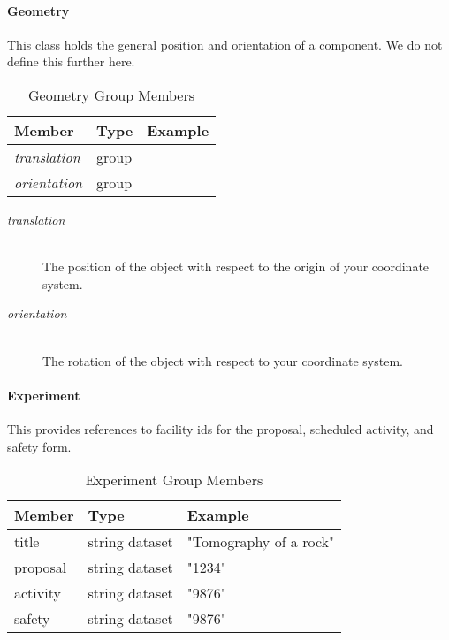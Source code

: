 \paragraph{Geometry}
\label{table:geometry}

This class holds the general position and orientation of a component. We do not define this
further here.

\begin{table}[h!]\sffamily \footnotesize
\centering
\caption{Geometry Group Members}
\begin{tabular}{l l l}
\toprule
\bfseries Member     & \bfseries Type & \bfseries Example \\
\midrule

\emph{translation} & group &  \\
\emph{orientation} & group & \\

\bottomrule
\end{tabular}
\end{table}

\begin{description}
\item[\emph{translation}] \hfill \\
{The position of the object with respect to the origin of your coordinate system.}

\item[\emph{orientation}] \hfill \\
{The rotation of the object with respect to your coordinate system.}
\end{description}

\paragraph{Experiment}

This provides references to facility ids for the proposal, scheduled
activity, and safety form.

\begin{table}[h!]\sffamily \footnotesize
\centering
\caption{Experiment Group Members}
\begin{tabular}{l l l}
\toprule
\bfseries Member     & \bfseries Type & \bfseries Example \\
\midrule
title & string dataset & "Tomography of a rock"\\
proposal & string dataset &  "1234" \\
activity & string dataset &  "9876" \\
safety & string dataset &  "9876" \\
\bottomrule
\end{tabular}
\label{table:experiment}
\end{table}

